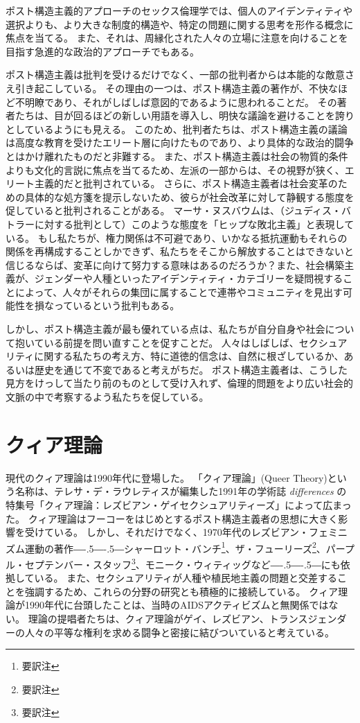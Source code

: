 \documentclass[paper=a4,book,openany]{jlreq}
\def\DDASH{―\kern-.5\zw―\kern-.5\zw―} %
\begin{document}
ポスト構造主義的アプローチのセックス倫理学では、個人のアイデンティティや選択よりも、より大きな制度的構造や、特定の問題に関する思考を形作る概念に焦点を当てる。
また、それは、周縁化された人々の立場に注意を向けることを目指す急進的な政治的アプローチでもある。

ポスト構造主義は批判を受けるだけでなく、一部の批判者からは本能的な敵意さえ引き起こしている。
その理由の一つは、ポスト構造主義の著作が、不快なほど不明瞭であり、それがしばしば意図的であるように思われることだ。
その著者たちは、目が回るほどの新しい用語を導入し、明快な議論を避けることを誇りとしているようにも見える。
このため、批判者たちは、ポスト構造主義の議論は高度な教育を受けたエリート層に向けたものであり、より具体的な政治的闘争とはかけ離れたものだと非難する。
また、ポスト構造主義は社会の物質的条件よりも文化的言説に焦点を当てるため、左派の一部からは、その視野が狭く、エリート主義的だと批判されている。
さらに、ポスト構造主義者は社会変革のための具体的な処方箋を提示しないため、彼らが社会改革に対して静観する態度を促していると批判されることがある。
マーサ・ヌスバウムは、（ジュディス・バトラーに対する批判として）このような態度を「ヒップな敗北主義」と表現している\citep{nussbaum99:_profes_of_parody}。
もし私たちが、権力関係は不可避であり、いかなる抵抗運動もそれらの関係を再構成することしかできず、私たちをそこから解放することはできないと信じるならば、変革に向けて努力する意味はあるのだろうか？また、社会構築主義が、ジェンダーや人種といったアイデンティティ・カテゴリーを疑問視することによって、人々がそれらの集団に属することで連帯やコミュニティを見出す可能性を損なっているという批判もある。

しかし、ポスト構造主義が最も優れている点は、私たちが自分自身や社会について抱いている前提を問い直すことを促すことだ。
人々はしばしば、セクシュアリティに関する私たちの考え方、特に道徳的信念は、自然に根ざしているか、あるいは歴史を通じて不変であると考えがちだ。
ポスト構造主義者は、こうした見方をけっして当たり前のものとして受け入れず、倫理的問題をより広い社会的文脈の中で考察するよう私たちを促している。

\section{クィア理論}

現代のクィア理論は1990年代に登場した。
「クィア理論」(Queer Theory)という名称は、テレサ・デ・ラウレティスが編集した1991年の学術誌 \emph{differences} の特集号「クィア理論：レズビアン・ゲイセクシュアリティーズ」によって広まった\citep{lauretis91:_diff}。
クィア理論はフーコーをはじめとするポスト構造主義者の思想に大きく影響を受けている。
しかし、それだけでなく、1970年代のレズビアン・フェミニズム運動の著作{\DDASH}シャーロット・バンチ\footnote{要訳注}、ザ・フューリーズ\footnote{要訳注}、パープル・セプテンバー・スタッフ\footnote{要訳注}、モニーク・ウィティッグなど{\DDASH}にも依拠している。
また、セクシュアリティが人種や植民地主義の問題と交差することを強調するため、これらの分野の研究とも積極的に接続している。
クィア理論が1990年代に台頭したことは、当時のAIDSアクティビズムと無関係ではない。
理論の提唱者たちは、クィア理論がゲイ、レズビアン、トランスジェンダーの人々の平等な権利を求める闘争と密接に結びついていると考えている。
\end{document}
